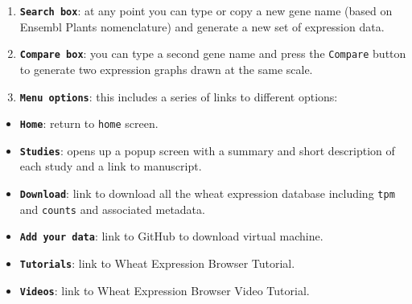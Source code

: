 \begin{enumerate}
\def\labelenumi{\arabic{enumi}.}
\itemsep1pt\parskip0pt
\item
  \textbf{\lstinline!Search box!}: at any point you can type or copy a
  new gene name (based on Ensembl Plants nomenclature) and generate a
  new set of expression data.
\item
  \textbf{\lstinline!Compare box!}: you can type a second gene name and
  press the \lstinline!Compare! button to generate two expression graphs
  drawn at the same scale.
\item
  \textbf{\lstinline!Menu options!}: this includes a series of links to
  different options:\\
\end{enumerate}

\begin{itemize}
\itemsep1pt\parskip0pt
\item
  \textbf{\lstinline!Home!}: return to \lstinline!home! screen.
\item
  \textbf{\lstinline!Studies!}: opens up a popup screen with a summary
  and short description of each study and a link to manuscript.
\item
  \textbf{\lstinline!Download!}: link to download all the wheat
  expression database including \lstinline!tpm! and \lstinline!counts!
  and associated metadata.
\item
  \textbf{\lstinline!Add your data!}: link to GitHub to download virtual
  machine.
\item
  \textbf{\lstinline!Tutorials!}: link to Wheat Expression Browser
  Tutorial.
\item
  \textbf{\lstinline!Videos!}: link to Wheat Expression Browser Video
  Tutorial.
\end{itemize}


